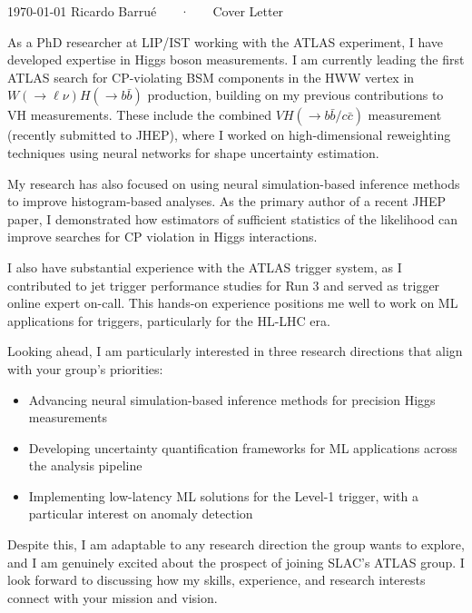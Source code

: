 \documentclass[11pt, a4paper]{awesome-cv}
\begin{document}
\makecvheader[R]

\makecvfooter
  {\today}
  {Ricardo Barrué ~~~·~~~ Cover Letter}
  {}

\makelettertitle

\begin{cvletter}

  As a PhD researcher at LIP/IST working with the ATLAS experiment, I have developed expertise in Higgs boson measurements. I am currently leading the first ATLAS search for CP-violating BSM components in the HWW vertex in $W(\to \ell \nu)H(\to b\bar{b})$ production, building on my previous contributions to VH measurements. These include the combined $VH(\to b\bar{b}/c\bar{c})$ measurement (recently submitted to JHEP), where I worked on high-dimensional reweighting techniques using neural networks for shape uncertainty estimation.

  My research has also focused on using neural simulation-based inference methods to improve histogram-based analyses. As the primary author of a recent JHEP paper, I demonstrated how estimators of sufficient statistics of the likelihood can improve searches for CP violation in Higgs interactions.
  
  I also have substantial experience with the ATLAS trigger system, as I contributed to jet trigger performance studies for Run 3 and served as trigger online expert on-call. This hands-on experience positions me well to work on ML applications for triggers, particularly for the HL-LHC era.
  
  Looking ahead, I am particularly interested in three research directions that align with your group's priorities:
  \begin{itemize}
    \item Advancing neural simulation-based inference methods for precision Higgs measurements
    \item Developing uncertainty quantification frameworks for ML applications across the analysis pipeline
    \item Implementing low-latency ML solutions for the Level-1 trigger, with a particular interest on anomaly detection
  \end{itemize}
  
  Despite this, I am adaptable to any research direction the group wants to explore, and I am genuinely excited about the prospect of joining SLAC's ATLAS group. I look forward to discussing how my skills, experience, and research interests connect with your mission and vision.

\end{cvletter}


\makeletterclosing
\end{document}
